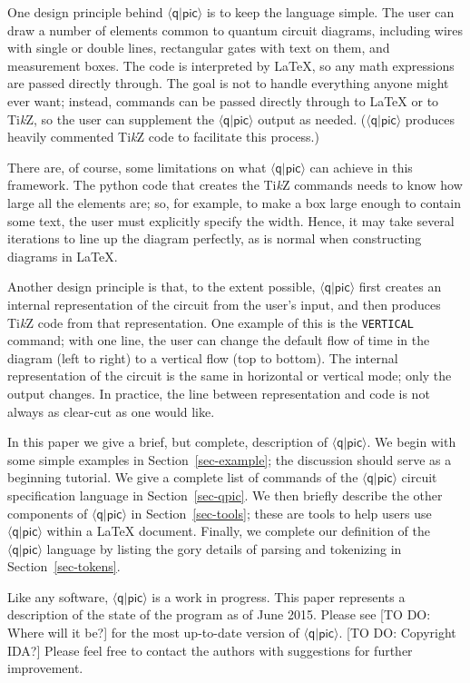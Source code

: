 \documentclass[twoside,12pt]{article}
\newcommand{\qpic}{$\langle\mathsf{q}|\mathsf{pic}\rangle$\xspace}
\newcommand{\TikZ}{Ti\emph{k}Z\xspace}
\begin{document}
One design principle behind \qpic is to keep the language simple.  The user can draw a number of
elements common to quantum circuit diagrams, including wires with single or double lines, rectangular
gates with text on them, and measurement boxes.  The code is interpreted by \LaTeX, so any math expressions
are passed directly through.  The goal is not to handle everything anyone might ever want; instead,
commands can be passed directly through to {\LaTeX} or to \TikZ, so the user can supplement the \qpic output
as needed.  (\qpic produces heavily commented \TikZ code to facilitate this process.)


There are, of course, some limitations on what \qpic can achieve in this framework.  The python code
that creates the \TikZ commands needs to know how large all the elements are; so, for example, to make
a box large enough to contain some text, the user must explicitly specify the width.  Hence, it may
take several iterations to line up the diagram perfectly, as is normal when constructing diagrams in \LaTeX.


Another design principle is that, to the extent possible, \qpic first creates an internal representation
of the circuit from the user's input, and then produces \TikZ code from that representation.  One example
of this is the {\tt VERTICAL} command; with one line, the user can change the default flow of time in the
diagram (left to right) to a vertical flow (top to bottom).  The internal representation of the circuit is
the same in horizontal or vertical mode; only the output changes.  In practice, the line between
representation and code is not always as clear-cut as one would like.


In this paper we give a brief, but complete, description of \qpic.  We begin with some simple examples in
Section~\ref{sec-example}; the discussion should serve as a beginning tutorial.  
We give a complete list of commands of the \qpic circuit specification language
in Section~\ref{sec-qpic}.  We then briefly describe the other components of \qpic in Section~\ref{sec-tools};
these are tools to help users use \qpic within a {\LaTeX} document.  Finally, we complete our definition of the
\qpic language by listing the gory details of parsing and tokenizing in Section~\ref{sec-tokens}.

Like any software, \qpic is a work in progress.  This paper represents a description of the state of
the program as of June 2015.  Please see [TO DO:  Where will it be?]  for the most up-to-date version of \qpic.  [TO DO:  Copyright IDA?]
Please feel free to contact the authors with suggestions for further improvement.
\end{document}
